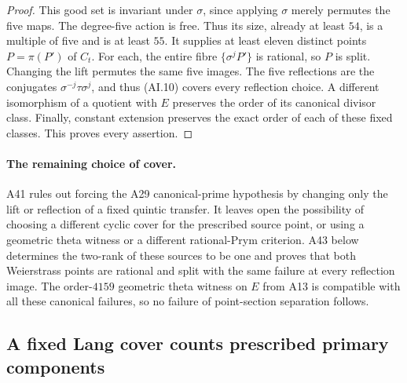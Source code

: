\documentclass[11pt,a4paper]{article}
\begin{document}
\begin{proof}
This good set is invariant under $\sigma$, since applying
$\sigma$ merely permutes the five maps. The degree-five
action is free. Thus its size, already at least $54$, is
a multiple of five and is at least $55$. It supplies at
least eleven distinct points $P=\pi(P')$ of $C_t$.
For each, the entire fibre $\{\sigma^jP'\}$ is rational,
so $P$ is split. Changing the lift permutes the same five
images. The five reflections are the conjugates
$\sigma^{-j}\tau\sigma^j$, and thus (AI.10) covers every
reflection choice. A different isomorphism of a quotient
with $E$ preserves the order of its canonical divisor
class. Finally, constant extension preserves the exact
order of each of these fixed classes. This proves every
assertion.
\end{proof}

\paragraph{The remaining choice of cover.}
A41 rules out forcing the A29 canonical-prime hypothesis
by changing only the lift or reflection of a fixed
quintic transfer. It leaves open the possibility of
choosing a different cyclic cover for the prescribed
source point, or using a geometric theta witness or a
different rational-Prym criterion. A43 below determines the
two-rank of these sources to be one and proves that both
Weierstrass points are rational and split with the same failure
at every reflection image. The order-$4159$
geometric theta witness on $E$ from A13 is compatible
with all these canonical failures, so no failure of
point-section separation follows.


\subsection{A fixed Lang cover counts prescribed primary components}
\label{sec:fixed-lang-density}
\end{document}
